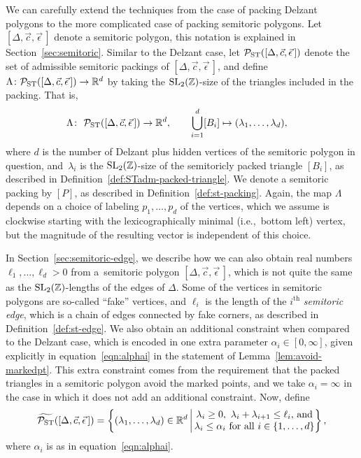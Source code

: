 \documentclass[10pt,a4paper]{amsart}
\numberwithin{equation}{section}
\def\R{{\mathbb R}}
\def\Z{{\mathbb Z}}
\newcommand{\De}{\Delta}
\newcommand{\PST}{\mathcal{P}_{\rm ST}}
\newcommand{\PSTtilde}{\widetilde{\mathcal{P}_{\rm ST}}}
\newcommand{\SL}{{\rm SL}_2(\Z)}
\newcommand{\stpoly}{[\De,\vec{c},\vec{\epsilon}\,]}
\theoremstyle{definition}
\theoremstyle{plain}
\theoremstyle{plain}
\begin{document}
We can carefully extend the techniques from the case of packing Delzant polygons to the more complicated case of packing semitoric polygons.
Let $\stpoly$ denote a semitoric polygon, this notation is explained in Section~\ref{sec:semitoric}.
Similar to the Delzant case, let $\PST(\stpoly)$ denote the set of admissible semitoric packings of $\stpoly$, and define $\Lambda \colon \PST(\stpoly)\to\R^d$ by taking the $\SL$-size of the triangles included in the packing. That is,
\begin{align}\label{eqn:LambdaST} \Lambda \colon\ \PST(\stpoly)   \to \R^d, \qquad \bigcup_{i=1}^d [B_i] & \mapsto (\lambda_1,\ldots, \lambda_d),
\end{align}
where $d$ is the number of Delzant plus hidden vertices of the semitoric polygon in question, and~$\lambda_i$ is the $\SL$-size of the semitoricly packed triangle $[B_i]$, as described in Definition~\ref{def:STadm-packed-triangle}. We denote a semitoric packing by $[P]$, as described in Definition~\ref{def:st-packing}.
Again, the map $\Lambda$ depends on a choice of labeling $p_1,\ldots,p_d$ of the vertices, which we assume is clockwise starting with the lexicographically minimal (i.e.,~bottom left) vertex, but the magnitude of the resulting vector is independent of this choice.

In Section~\ref{sec:semitoric-edge},
 we describe how we can also obtain real numbers $\ell_1,\ldots, \ell_d>0$ from a~semitoric polygon $\stpoly$, which is not quite the same as the $\SL$-lengths of the edges of $\De$.
Some of the vertices in semitoric polygons are so-called ``fake'' vertices, and $\ell_i$ is the length of the $i^\mathrm{th}$ \emph{semitoric edge}, which is a chain of edges connected by fake corners, as described in Definition~\ref{def:st-edge}.
We also obtain an additional constraint when compared to the Delzant case, which is encoded in one extra parameter $\alpha_i\in [0,\infty]$, given explicitly in equation~\eqref{eqn:alphai} in the statement of Lemma~\ref{lem:avoid-markedpt}. This extra constraint comes from the requirement that the packed triangles in a semitoric polygon avoid the marked points, and we take $\alpha_i=\infty$ in the case in which it does not add an additional constraint. Now, define
\begin{equation}\label{eqn:PSTtilde}
 \PSTtilde(\stpoly) = \left\{(\lambda_1,\ldots,\lambda_d)\in\R^d \,\bigg|\, \begin{matrix}\lambda_i\geq 0,\  \lambda_i+\lambda_{i+1}\leq \ell_i \text{, and}\\  \lambda_i\leq \alpha_i\text{ for all }i\in\{1,\ldots,d\}\end{matrix}\right\},
\end{equation}
where $\alpha_i$ is as in equation~\eqref{eqn:alphai}.
\end{document}

